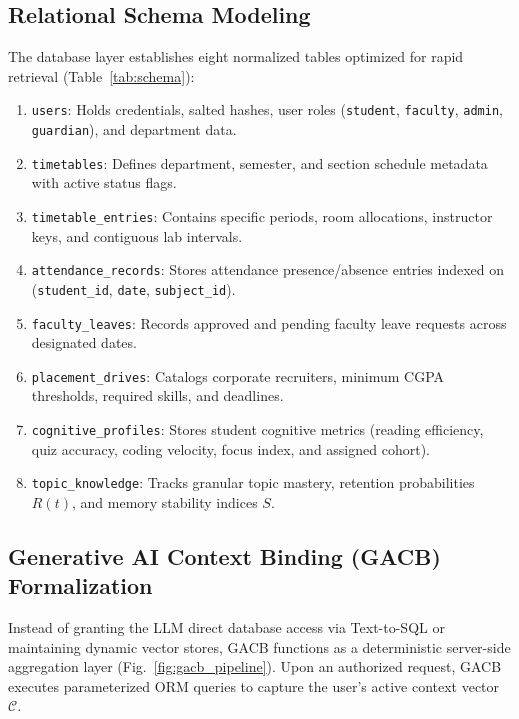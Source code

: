 \documentclass[conference]{IEEEtran}
\begin{document}
\subsection{Relational Schema Modeling}
The database layer establishes eight normalized tables optimized for rapid retrieval (Table~\ref{tab:schema}):
\begin{enumerate}
    \item \texttt{users}: Holds credentials, salted hashes, user roles (\texttt{student}, \texttt{faculty}, \texttt{admin}, \texttt{guardian}), and department data.
    \item \texttt{timetables}: Defines department, semester, and section schedule metadata with active status flags.
    \item \texttt{timetable\_entries}: Contains specific periods, room allocations, instructor keys, and contiguous lab intervals.
    \item \texttt{attendance\_records}: Stores attendance presence/absence entries indexed on (\texttt{student\_id}, \texttt{date}, \texttt{subject\_id}).
    \item \texttt{faculty\_leaves}: Records approved and pending faculty leave requests across designated dates.
    \item \texttt{placement\_drives}: Catalogs corporate recruiters, minimum CGPA thresholds, required skills, and deadlines.
    \item \texttt{cognitive\_profiles}: Stores student cognitive metrics (reading efficiency, quiz accuracy, coding velocity, focus index, and assigned cohort).
    \item \texttt{topic\_knowledge}: Tracks granular topic mastery, retention probabilities $R(t)$, and memory stability indices $S$.
\end{enumerate}

\subsection{Generative AI Context Binding (GACB) Formalization}
Instead of granting the LLM direct database access via Text-to-SQL or maintaining dynamic vector stores, GACB functions as a deterministic server-side aggregation layer (Fig.~\ref{fig:gacb_pipeline}). Upon an authorized request, GACB executes parameterized ORM queries to capture the user's active context vector $\mathcal{C}$.
\end{document}
